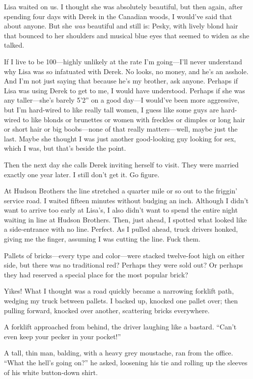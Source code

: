Lisa waited on us. I thought she was absolutely beautiful, but then
again, after spending four days with Derek in the Canadian woods, I
would've said that about anyone. But she \emph{was} beautiful and still
is: Pesky, with lively blond hair that bounced to her shoulders and
musical blue eyes that seemed to widen as she talked.

If I live to be 100---highly unlikely at the rate I'm going---I'll never
understand why Lisa was so infatuated with Derek. No looks, no money,
and he's an asshole. And I'm not just saying that because he's my
brother, ask anyone. Perhaps if Lisa was using Derek to get to me, I
would have understood. Perhaps if she was any taller---she's barely
5'2'' on a good day---I would've been more aggressive, but I'm
hard-wired to like really tall women, I guess like some guys are
hard-wired to like blonds or brunettes or women with freckles or dimples
or long hair or short hair or big boobs---none of that really
matters---well, maybe just the last. Maybe she thought I was just
another good-looking guy looking for sex, which I was, but that's beside
the point.

Then the next day she calls Derek inviting herself to visit. They were
married exactly one year later. I still don't get it. Go figure.

At Hudson Brothers the line stretched a quarter mile or so out to the
friggin' service road. I waited fifteen minutes without budging an inch.
Although I didn't want to arrive too early at Lisa's, I also didn't want
to spend the entire night waiting in line at Hudson Brothers. Then, just
ahead, I spotted what looked like a side-entrance with no line. Perfect.
As I pulled ahead, truck drivers honked, giving me the finger, assuming
I was cutting the line. Fuck them.

Pallets of bricks---every type and color---were stacked twelve-foot high
on either side, but there was no traditional red? Perhaps they were sold
out? Or perhaps they had reserved a special place for the most popular
brick?

Yikes! What I thought was a road quickly became a narrowing forklift
path, wedging my truck between pallets. I backed up, knocked one pallet
over; then pulling forward, knocked over another, scattering bricks
everywhere.

A forklift approached from behind, the driver laughing like a bastard.
``Can't even keep your pecker in your pocket!''

A tall, thin man, balding, with a heavy grey moustache, ran from the
office. ``What the hell's going on?'' he asked, loosening his tie and
rolling up the sleeves of his white button-down shirt.

